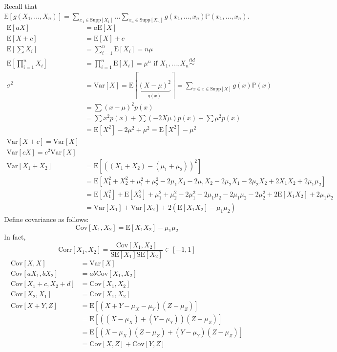\documentclass[12pt]{article}
\newcommand{\prob}[1]{\mathbb{P}(#1)}
\newcommand{\iid}{\stackrel{iid}{\sim}}
\newcommand{\suppx}{x \in \text{Supp}[X]}
\newcommand{\expected}[1]{\mathrm{E}[#1]}
\newcommand{\variance}[1]{\mathrm{Var}[#1]}
\newcommand{\covariance}[1]{\mathrm{Cov}[#1]}
\begin{document}
Recall that $\expected{g(X_1, \dots, X_n)} = \sum_{x_1 \in \text{Supp}[X_1]} \dots \sum_{x_n \in \text{Supp}[X_n]} g(x_1, \dots, x_n) \prob{x_1, \dots, x_n}$. 
$$\begin{aligned} \expected{aX} &= a\expected{X} \\ \expected{X + c} &= \expected{X} + c \\ \expected{\sum X_i} &= \sum_{i = 1}^n \expected{X_i} = n\mu \\ \expected{\prod_{i = 1}^n X_i} &= \prod_{i = 1}^n \expected{X_i} = \mu^n \text{ if } X_1, \dots, X_n \iid \\ \sigma^2 &= \variance{X} = \expected{\underbrace{(X - \mu)^2}_{g(x)}} = \sum_{x \in \suppx} g(x)\prob{x} \\ &= \sum (x - \mu)^2 p(x) \\ &= \sum x^2 p(x) + \sum (-2X\mu) p(x) + \sum \mu^2 p(x) \\ &= \expected{X^2} - 2\mu^2 + \mu^2 = \expected{X^2} - \mu^2 \\ \variance{X + c} = \variance{X} \\ \variance{cX} = c^2\variance{X} \\ \variance{X_1 + X_2} &= \expected{((X_1 + X_2) - (\mu_1 + \mu_2))^2} \\ &= \expected{X_1^2 + X_2^2 + \mu_1^2 + \mu_2^2 - 2\mu_1X_1 - 2\mu_1X_2 - 2\mu_2X_1 - 2\mu_2X_2 + 2X_1X_2 + 2\mu_1\mu_2} \\ &= \expected{X_1^2} + \expected{X_2^2} + \mu_1^2 + \mu_2^2 - 2\mu_1^2 - 2\mu_1\mu_2 - 2\mu_1\mu_2 - 2\mu_2^2 + 2\expected{X_1X_2} + 2\mu_1\mu_2 \\ &= \variance{X_1} + \variance{X_2} + 2(\expected{X_1X_2} - \mu_1\mu_2) \end{aligned} $$ 
Define covariance as follows: 
$$ \covariance{X_1, X_2} = \expected{X_1X_2} - \mu_1\mu_2 $$ In fact, $$\text{Corr}[X_1, X_2] = \frac{\covariance{X_1, X_2}}{\text{SE}[X_1]\text{SE}[X_2]} \in [-1, 1] $$ 
$$\begin{aligned} 
\covariance{X, X} &= \variance{X} \\
\covariance{aX_1, bX_2} &= ab\covariance{X_1, X_2} \\
\covariance{X_1 + c, X_2 + d} &= \covariance{X_1, X_2} \\ 
\covariance{X_2, X_1} &= \covariance{X_1, X_2} \\ 
\covariance{X + Y, Z} &= \expected{(X + Y - \mu_X - \mu_Y)(Z - \mu_Z)} \\ &= \expected{((X - \mu_X) + (Y - \mu_Y))(Z - \mu_Z)} \\ &= \expected{(X - \mu_X)(Z - \mu_Z) + (Y - \mu_Y)(Z - \mu_Z)} \\ &= \covariance{X, Z} + \covariance{Y, Z} \end{aligned} $$
\end{document}
